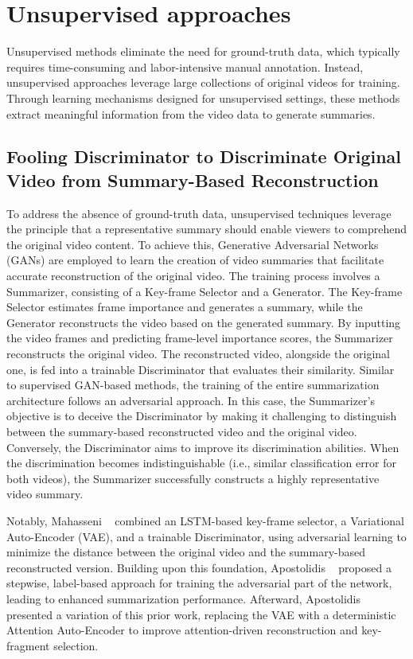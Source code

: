 \section{Unsupervised approaches} 
\label{section:rel-unsupervised} 

    Unsupervised methods eliminate the need for ground-truth data, which typically requires time-consuming and labor-intensive manual annotation. Instead, unsupervised approaches leverage large collections of original videos for training. Through learning mechanisms designed for unsupervised settings, these methods extract meaningful information from the video data to generate summaries.

    \subsection{Fooling Discriminator to Discriminate Original Video from Summary-Based Reconstruction}
    \label{section:rel-unsup-discriminative}

        To address the absence of ground-truth data, unsupervised techniques leverage the principle that a representative summary should enable viewers to comprehend the original video content. To achieve this, Generative Adversarial Networks (GANs) are employed to learn the creation of video summaries that facilitate accurate reconstruction of the original video. The training process involves a Summarizer, consisting of a Key-frame Selector and a Generator. The Key-frame Selector estimates frame importance and generates a summary, while the Generator reconstructs the video based on the generated summary. By inputting the video frames and predicting frame-level importance scores, the Summarizer reconstructs the original video. The reconstructed video, alongside the original one, is fed into a trainable Discriminator that evaluates their similarity. Similar to supervised GAN-based methods, the training of the entire summarization architecture follows an adversarial approach. In this case, the Summarizer's objective is to deceive the Discriminator by making it challenging to distinguish between the summary-based reconstructed video and the original video. Conversely, the Discriminator aims to improve its discrimination abilities. When the discrimination becomes indistinguishable (i.e., similar classification error for both videos), the Summarizer successfully constructs a highly representative video summary.
        
        Notably, Mahasseni \etal~\cite{mahasseni2017unsupervised} combined an LSTM-based key-frame selector, a Variational Auto-Encoder (VAE), and a trainable Discriminator, using adversarial learning to minimize the distance between the original video and the summary-based reconstructed version. Building upon this foundation, Apostolidis \etal~\cite{apostolidis2019stepwise} proposed a stepwise, label-based approach for training the adversarial part of the network, leading to enhanced summarization performance. Afterward, Apostolidis \etal~\cite{apostolidis2020unsupervised} presented a variation of this prior work, replacing the VAE with a deterministic Attention Auto-Encoder to improve attention-driven reconstruction and key-fragment selection.
        
